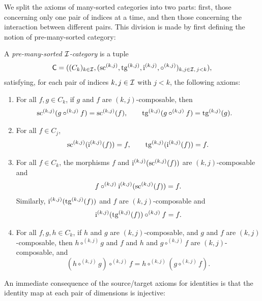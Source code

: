 We split the axioms of many-sorted categories into two parts: first, those concerning only one pair
of indices at a time, and then those concerning the interaction between different pairs. This
division is made by first defining the notion of pre-many-sorted category:

\begin{definition}
  \label{def:PreManySortedCategory}
  \leanok
  A \emph{pre-many-sorted $\mathcal{I}$-category} is a tuple
  \[
    \mathsf{C} = ((C_k)_{k \in \mathcal{I}}, (\operatorname{sc}^{(k,j)}, \operatorname{tg}^{(k,j)}, \operatorname{i}^{(k,j)},
    \circ^{(k,j)})_{k, j \in \mathcal{I}, \, j < k}),
  \]
  satisfying, for each pair of indices $k, j \in \mathcal{I}$ with $j < k$, the following axioms:

  \begin{enumerate}
    \item \label{ax:ms_sc_tg_comp} For all $f, g \in C_k$, if $g$ and $f$ are $(k,j)$-composable,
      then
      \begin{align*}
        \operatorname{sc}^{(k,j)} (g \circ^{(k,j)} f) = \operatorname{sc}^{(k,j)} (f), \qquad &
        \operatorname{tg}^{(k,j)} (g \circ^{(k,j)} f) = \operatorname{tg}^{(k,j)} (g).
      \end{align*}
    \item \label{ax:ms_sc_tg_idm} For all $f \in C_j$,
      \[
        \operatorname{sc}^{(k,j)} (\operatorname{i}^{(k,j)} (f)) = f, \qquad \operatorname{tg}^{(k,j)} (\operatorname{i}^{(k,j)} (f)) = f.
      \]
    \item \label{ax:ms_id_laws} For all $f \in C_k$, the morphisms $f$ and $\operatorname{i}^{(k,j)}
      (\operatorname{sc}^{(k,j)} (f))$ are $(k,j)$-composable and
      \[
        f \circ^{(k,j)} \operatorname{i}^{(k,j)} (\operatorname{sc}^{(k,j)} (f)) = f.
      \]
      Similarly, $\operatorname{i}^{(k,j)} (\operatorname{tg}^{(k,j)} (f))$ and $f$ are $(k,j)$-composable and
      \[
        \operatorname{i}^{(k,j)} (\operatorname{tg}^{(k,j)} (f)) \circ^{(k,j)} f = f.
      \]
    \item \label{ax:ms_assoc} For all $f, g, h \in C_k$, if $h$ and $g$ are $(k,j)$-composable, and
      $g$ and $f$ are $(k,j)$-composable, then $h \circ^{(k,j)} g$ and $f$ and $h$ and $g
      \circ^{(k,j)} f$ are $(k,j)$-composable, and
      \[
        (h \circ^{(k,j)} g) \circ^{(k,j)} f = h \circ^{(k,j)} (g \circ^{(k,j)} f).
      \]
  \end{enumerate}

\end{definition}

An immediate consequence of the source/target axioms for identities is that the identity map at each
pair of dimensions is injective:


